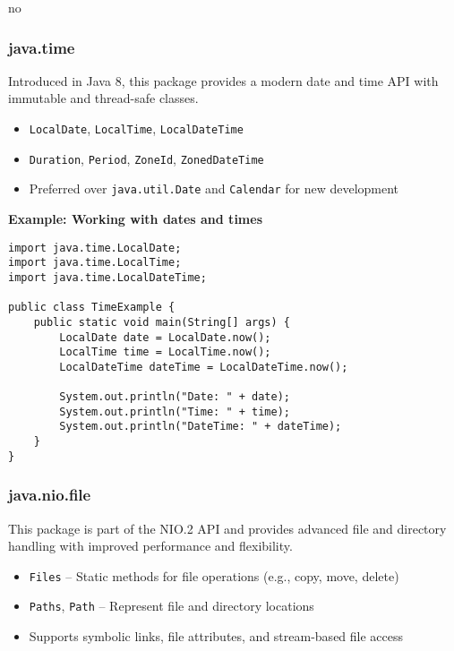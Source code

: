 no\documentclass{article}
\newcommand{\codecmd}[1]{\textcolor[rgb]{0,0.5,0}{\texttt{#1}}}
\begin{document}
\subsubsection*{java.time}

Introduced in Java 8, this package provides a modern date and time API with immutable and thread-safe classes.

\begin{itemize}
    \item \codecmd{LocalDate}, \codecmd{LocalTime}, \codecmd{LocalDateTime}
    \item \codecmd{Duration}, \codecmd{Period}, \codecmd{ZoneId}, \codecmd{ZonedDateTime}
    \item Preferred over \codecmd{java.util.Date} and \codecmd{Calendar} for new development
\end{itemize}

\noindent\textbf{Example: Working with dates and times}
\begin{verbatim}
import java.time.LocalDate;
import java.time.LocalTime;
import java.time.LocalDateTime;

public class TimeExample {
    public static void main(String[] args) {
        LocalDate date = LocalDate.now();
        LocalTime time = LocalTime.now();
        LocalDateTime dateTime = LocalDateTime.now();

        System.out.println("Date: " + date);
        System.out.println("Time: " + time);
        System.out.println("DateTime: " + dateTime);
    }
}
\end{verbatim}

\subsubsection*{java.nio.file}

This package is part of the NIO.2 API and provides advanced file and directory handling with improved performance and flexibility.

\begin{itemize}
    \item \codecmd{Files} – Static methods for file operations (e.g., copy, move, delete)
    \item \codecmd{Paths}, \codecmd{Path} – Represent file and directory locations
    \item Supports symbolic links, file attributes, and stream-based file access
\end{itemize}
\end{document}
